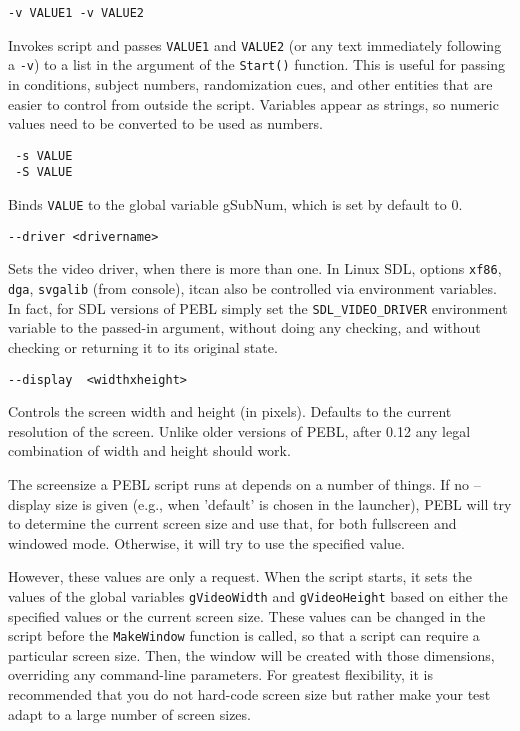 \begin{description}

\item
\begin{verbatim}
-v VALUE1 -v VALUE2
\end{verbatim}
  Invokes script and passes \texttt{VALUE1} and \texttt{VALUE2} (or any text
  immediately following a \texttt{-v}) to a list in the argument of
  the \texttt{Start()}  function. \newline This is useful for passing in
  conditions, subject numbers, randomization cues, and other
  entities that are easier to control from outside  the
  script.  Variables appear as strings, so numeric values
  need to be converted to be used as numbers.

\item
\begin{verbatim}
 -s VALUE
 -S VALUE
\end{verbatim}
  Binds \texttt{VALUE} to the global variable gSubNum, which is set by
  default to 0.

\item 
\begin{verbatim}
--driver <drivername>
\end{verbatim}
  Sets the video driver, when there is more than one.  In Linux SDL,
  options \texttt{xf86}, \texttt{dga}, \texttt{svgalib} (from
  console), itcan also be controlled via environment variables.  In
  fact, for SDL versions of PEBL simply set the
  \texttt{SDL\_VIDEO\_DRIVER} environment variable to the passed-in
  argument, without doing any checking, and without checking or
  returning it to its original state.

\item
\begin{verbatim}
--display  <widthxheight>
\end{verbatim}
  Controls the screen width and height (in pixels). Defaults
  to the current resolution of the screen.  Unlike older versions of PEBL, 
after 0.12 any legal combination of width and height should work.

The screensize a PEBL script runs at depends on a number of things. If no --display size is given
 (e.g., when 'default' is chosen in the launcher), PEBL will try to determine the current screen size 
and use that, for both fullscreen and windowed mode.  Otherwise, it will try to use the specified value.

However, these values are only a request.  When the script starts, it sets the values
of the global variables \texttt{gVideoWidth} and \texttt{gVideoHeight} based on either the 
specified values or the current screen size.  These values can be changed in the script before the \texttt{MakeWindow} function is called,
so that a script can require a particular screen size. 
Then, the window will be created with those dimensions, 
overriding any command-line parameters.   For greatest flexibility, it is recommended that you do not
hard-code screen size but rather make your test adapt to a large number of screen sizes.


\end{description}
